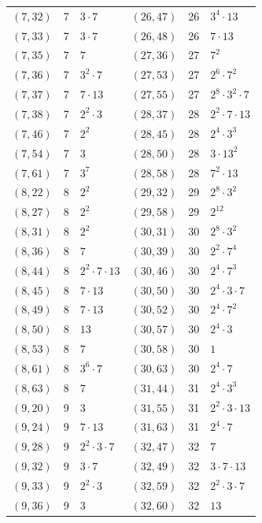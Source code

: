 \documentclass[11pt]{article}
\begin{document}
\begin{longtable}{@{}lrl@{\qquad}lrl@{}}
$(7,32)$ & 7 & $3\cdot 7$ & $(26,47)$ & 26 & $3^{4}\cdot 13$\\
$(7,33)$ & 7 & $3\cdot 7$ & $(26,48)$ & 26 & $7\cdot 13$\\
$(7,35)$ & 7 & $7$ & $(27,36)$ & 27 & $7^{2}$\\
$(7,36)$ & 7 & $3^{2}\cdot 7$ & $(27,53)$ & 27 & $2^{6}\cdot 7^{2}$\\
$(7,37)$ & 7 & $7\cdot 13$ & $(27,55)$ & 27 & $2^{8}\cdot 3^{2}\cdot 7$\\
$(7,38)$ & 7 & $2^{2}\cdot 3$ & $(28,37)$ & 28 & $2^{2}\cdot 7\cdot 13$\\
$(7,46)$ & 7 & $2^{2}$ & $(28,45)$ & 28 & $2^{4}\cdot 3^{3}$\\
$(7,54)$ & 7 & $3$ & $(28,50)$ & 28 & $3\cdot 13^{2}$\\
$(7,61)$ & 7 & $3^{7}$ & $(28,58)$ & 28 & $7^{2}\cdot 13$\\
$(8,22)$ & 8 & $2^{2}$ & $(29,32)$ & 29 & $2^{8}\cdot 3^{2}$\\
$(8,27)$ & 8 & $2^{2}$ & $(29,58)$ & 29 & $2^{12}$\\
$(8,31)$ & 8 & $2^{2}$ & $(30,31)$ & 30 & $2^{8}\cdot 3^{2}$\\
$(8,36)$ & 8 & $7$ & $(30,39)$ & 30 & $2^{2}\cdot 7^{4}$\\
$(8,44)$ & 8 & $2^{2}\cdot 7\cdot 13$ & $(30,46)$ & 30 & $2^{4}\cdot 7^{3}$\\
$(8,45)$ & 8 & $7\cdot 13$ & $(30,50)$ & 30 & $2^{4}\cdot 3\cdot 7$\\
$(8,49)$ & 8 & $7\cdot 13$ & $(30,52)$ & 30 & $2^{4}\cdot 7^{2}$\\
$(8,50)$ & 8 & $13$ & $(30,57)$ & 30 & $2^{4}\cdot 3$\\
$(8,53)$ & 8 & $7$ & $(30,58)$ & 30 & $1$\\
$(8,61)$ & 8 & $3^{6}\cdot 7$ & $(30,63)$ & 30 & $2^{4}\cdot 7$\\
$(8,63)$ & 8 & $7$ & $(31,44)$ & 31 & $2^{4}\cdot 3^{3}$\\
$(9,20)$ & 9 & $3$ & $(31,55)$ & 31 & $2^{2}\cdot 3\cdot 13$\\
$(9,24)$ & 9 & $7\cdot 13$ & $(31,63)$ & 31 & $2^{4}\cdot 7$\\
$(9,28)$ & 9 & $2^{2}\cdot 3\cdot 7$ & $(32,47)$ & 32 & $7$\\
$(9,32)$ & 9 & $3\cdot 7$ & $(32,49)$ & 32 & $3\cdot 7\cdot 13$\\
$(9,33)$ & 9 & $2^{2}\cdot 3$ & $(32,59)$ & 32 & $2^{2}\cdot 3\cdot 7$\\
$(9,36)$ & 9 & $3$ & $(32,60)$ & 32 & $13$\\

\end{longtable}
\end{document}
